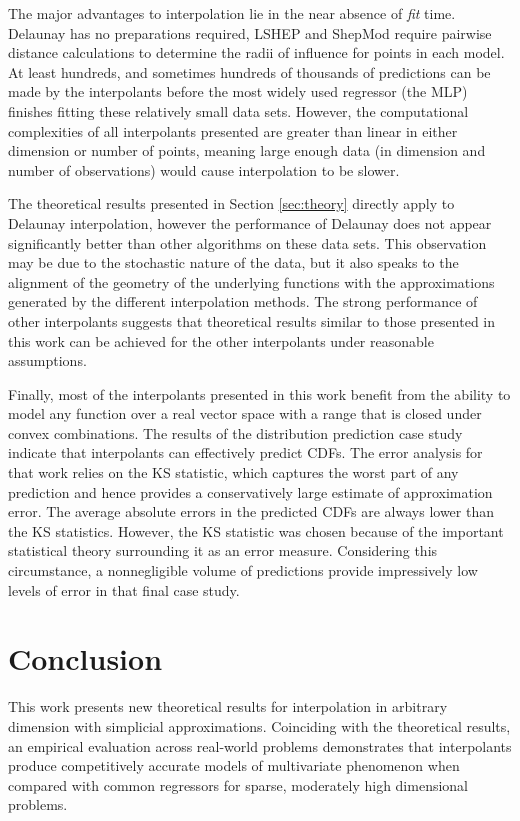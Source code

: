 \documentclass[smallextended,final]{svjour3}       %
\begin{document}
The major advantages to interpolation lie in the near absence of
\textit{fit} time. Delaunay has no preparations required, LSHEP and
ShepMod require pairwise distance calculations to determine the radii
of influence for points in each model. At least hundreds, and
sometimes hundreds of thousands of predictions can be made by the
interpolants before the most widely used regressor (the MLP) finishes
fitting these relatively small data sets. However, the computational
complexities of all interpolants presented are greater than linear in
either dimension or number of points, meaning large enough data (in
dimension and number of observations) would cause interpolation to be
slower.

The theoretical results presented in Section \ref{sec:theory} directly
apply to Delaunay interpolation, however the performance of Delaunay
does not appear significantly better than other algorithms on these
data sets. This observation may be due to the stochastic nature of the
data, but it also speaks to the alignment of the geometry of the
underlying functions with the approximations generated by the
different interpolation methods. The strong performance of other
interpolants suggests that theoretical results similar to those
presented in this work can be achieved for the other interpolants
under reasonable assumptions.

Finally, most of the interpolants presented in this work benefit from
the ability to model any function over a real vector space with a
range that is closed under convex combinations. The results of the
distribution prediction case study indicate that interpolants can
effectively predict CDFs. The error analysis for that work relies on
the KS statistic, which captures the worst part of any prediction and
hence provides a conservatively large estimate of approximation
error. The average absolute errors in the predicted CDFs are always
lower than the KS statistics. However, the KS statistic was chosen
because of the important statistical theory surrounding it as an error
measure. Considering this circumstance, a nonnegligible volume of
predictions provide impressively low levels of error in that final
case study.


\section{Conclusion}
\label{sec:conclusion}

This work presents new theoretical results for interpolation in
arbitrary dimension with simplicial approximations. Coinciding with
the theoretical results, an empirical evaluation across real-world
problems demonstrates that interpolants produce competitively accurate
models of multivariate phenomenon when compared with common regressors
for sparse, moderately high dimensional problems.
\end{document}

